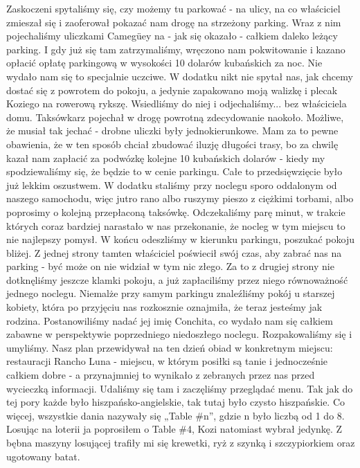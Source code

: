 \noindent Zaskoczeni spytaliśmy się, czy możemy tu parkować - na ulicy, na co właściciel zmieszał się i zaoferował pokazać nam drogę na strzeżony parking. 
Wraz z nim pojechaliśmy uliczkami Camegüey na - jak się okazało - całkiem daleko leżący parking.
I gdy już się tam zatrzymaliśmy, wręczono nam pokwitowanie i kazano opłacić opłatę parkingową w wysokości 10 dolarów kubańskich za noc. 
Nie wydało nam się to specjalnie uczciwe.
W dodatku nikt nie spytał nas, jak chcemy dostać się z powrotem do pokoju, a jedynie zapakowano moją walizkę i plecak Koziego na rowerową rykszę. 
Wsiedliśmy do niej i odjechaliśmy...
bez właściciela domu.
Taksówkarz pojechał w drogę powrotną zdecydowanie naokoło. Możliwe, że musiał tak jechać - drobne uliczki były jednokierunkowe. Mam za to pewne obawienia, że w ten sposób chciał zbudować iluzję długości trasy, bo za chwilę kazał nam zapłacić za podwózkę kolejne 10 kubańskich dolarów - kiedy my spodziewaliśmy się, że będzie to w cenie parkingu.
Całe to przedsięwzięcie było już lekkim oszustwem. 
W dodatku staliśmy przy noclegu sporo oddalonym od naszego samochodu, więc jutro rano albo ruszymy pieszo z ciężkimi torbami, albo poprosimy o kolejną przepłaconą taksówkę. 
Odczekaliśmy parę minut, w trakcie których coraz bardziej narastało w nas przekonanie, że nocleg w tym miejscu to nie najlepszy pomysł. W końcu odeszliśmy w kierunku parkingu, poszukać pokoju bliżej.
Z jednej strony tamten właściciel poświecił swój czas, aby zabrać nas na parking - być może on nie widział w tym nic złego.
Za to z drugiej strony nie dotknęliśmy jeszcze klamki pokoju, a już zapłaciliśmy przez niego równoważność jednego noclegu. 
Niemalże przy samym parkingu znaleźliśmy pokój u starszej kobiety, która po przyjęciu nas rozkosznie oznajmiła, że teraz jesteśmy jak rodzina. 
Postanowiliśmy nadać jej imię Conchita, co wydało nam się całkiem zabawne w perspektywie poprzedniego niedoszłego noclegu.
Rozpakowaliśmy się i umyliśmy. 
Nasz plan przewidywał na ten dzień obiad w konkretnym miejscu: restauracji Rancho Luna - miejscu, w którym posiłki są tanie i jednocześnie całkiem dobre - a przynajmniej to wynikało z zebranych przez nas przed wycieczką informacji. 
Udaliśmy się tam i zaczęliśmy przeglądać menu.
Tak jak do tej pory każde było hiszpańsko-angielskie, tak tutaj było czysto hiszpańskie. 
Co więcej, wszystkie dania nazywały się „Table \#n”, gdzie n było liczbą od 1 do 8.
Losując na loterii ja poprosiłem o Table \#4, Kozi natomiast wybrał jedynkę. 
Z bębna maszyny losującej trafiły mi się krewetki, ryż z szynką i szczypiorkiem oraz ugotowany batat. 
